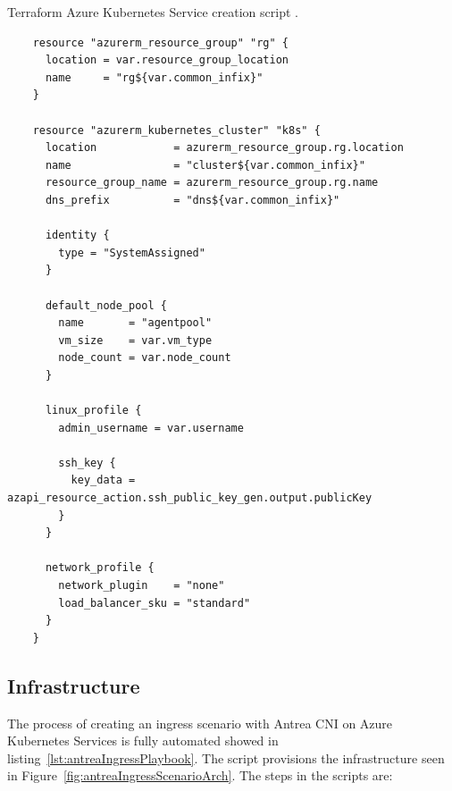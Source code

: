\begin{listing}[htb]
  \centering
  \caption{Terraform Azure Kubernetes Service creation script \cite{AKS}.}
  \begin{verbatim}
    resource "azurerm_resource_group" "rg" {
      location = var.resource_group_location
      name     = "rg${var.common_infix}"
    }

    resource "azurerm_kubernetes_cluster" "k8s" {
      location            = azurerm_resource_group.rg.location
      name                = "cluster${var.common_infix}"
      resource_group_name = azurerm_resource_group.rg.name
      dns_prefix          = "dns${var.common_infix}"

      identity {
        type = "SystemAssigned"
      }

      default_node_pool {
        name       = "agentpool"
        vm_size    = var.vm_type
        node_count = var.node_count
      }

      linux_profile {
        admin_username = var.username

        ssh_key {
          key_data = azapi_resource_action.ssh_public_key_gen.output.publicKey
        }
      }

      network_profile {
        network_plugin    = "none"
        load_balancer_sku = "standard"
      }
    }
  \end{verbatim}
  \label{lst:terraformScript}
\end{listing}


\subsection{Infrastructure}
\label{sec:infra}

The process of creating an ingress scenario with Antrea CNI on Azure Kubernetes Services is fully automated showed in listing~\ref{lst:antreaIngressPlaybook}. The script provisions the infrastructure seen in Figure~\ref{fig:antreaIngressScenarioArch}. The steps in the scripts are: 



